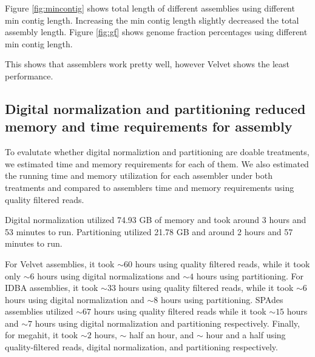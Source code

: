 Figure \ref{fig:mincontig} shows total length of different assemblies using different min contig length. Increasing the min contig length slightly decreased the total assembly length. 
Figure \ref{fig:gf} shows genome fraction percentages using different min contig length. 


This shows that assemblers work pretty well, however Velvet shows the least performance. 
\subsection*{Digital normalization and partitioning reduced memory and time requirements for assembly}

To evalutate whether digital normaliztion and partitioning are doable treatments, we estimated time and memory requirements for each of them. We also estimated the running time and memory utilization for each assembler under both treatments and compared to assemblers time and memory requirements using quality filtered reads.  

Digital normalization utilized 74.93  GB of memory and took  around 3 hours and 53 minutes to run. Partitioning utilized 21.78 GB and around 2 hours  and 57 minutes to run.

For Velvet assemblies, it  took $\sim 60$ hours using quality filtered reads, while it took only  $\sim 6$ hours using digital normalizations and  $\sim 4$ hours using partitioning.  For IDBA assemblies, it took $\sim 33$ hours using quality filtered reads, while it took $\sim 6$ hours using digital normalization and $\sim 8$ hours using partitioning. SPAdes assemblies utilized $\sim 67$ hours using quality filtered reads  while it took $\sim15$ hours and $\sim 7$ hours using digital normalization and partitioning respectively. Finally, for megahit, it  took $\sim 2$ hours, $\sim$ half an hour, and $\sim$ hour and a half using quality-filtered reads, digital normalization, and partitioning respectively. 
 
